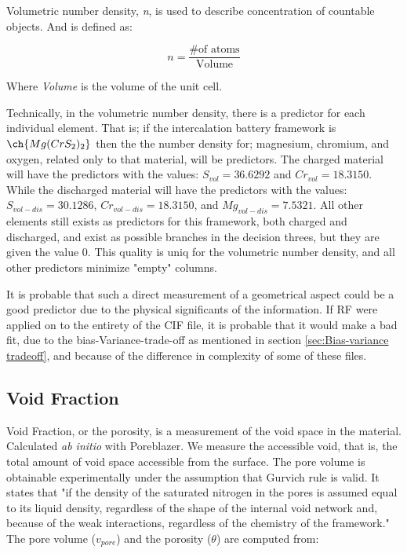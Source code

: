 	Volumetric number density, \textit{n}, is used to describe concentration of countable objects. And is defined as: 
	
\begin{equation}\label{eq:n}
n= \frac{\#\text{of atoms}}{\text{Volume}}
\end{equation}

	Where \textit{Volume} is the volume of the unit cell. 
	
	Technically, in the volumetric number density, there is a predictor for each individual element. That is; if the intercalation battery framework is $\ch{Mg(CrS_2)_2}$ then the the number density for; magnesium, chromium, and oxygen, related only to that material, will be predictors. The charged material will have the predictors with the values: $S_{vol} = 36.6292$ and $Cr_{vol} = 18.3150 $. While the discharged material will have the predictors with the values: $S_{vol-dis} = 30.1286$, $Cr_{vol-dis} =18.3150 $, and $Mg_{vol-dis} = 7.5321$. All other elements still exists as predictors for this framework, both charged and discharged, and exist as possible branches in the decision threes, but they are given the value $0$. This quality is uniq for the volumetric number density, and all other predictors minimize "empty" columns. 

It is probable that such a direct measurement of a geometrical aspect could be a good predictor due to the physical significants of the information. If RF were applied on to the entirety of the CIF file, it is probable that it would make a bad fit, due to the bias-Variance-trade-off as mentioned in section \ref{sec:Bias-variance tradeoff}, and because of the difference in complexity of some of these files. 

\subsection{Void Fraction} 

	Void Fraction, or the porosity, is a measurement of the void space in the material. Calculated \textit{ab initio} with Poreblazer\cite{ongari2017accurate}. We measure the accessible void, that is, the total amount of void space accessible from the surface. The pore volume is obtainable experimentally under the assumption that Gurvich rule is valid. It states that "if the density of the saturated nitrogen in the pores is assumed equal to its liquid density, regardless of the shape of the internal void network and, because of the weak interactions, regardless of the chemistry of the framework." The pore volume ($v_{pore}$) and the porosity ($\theta$) are computed from:

